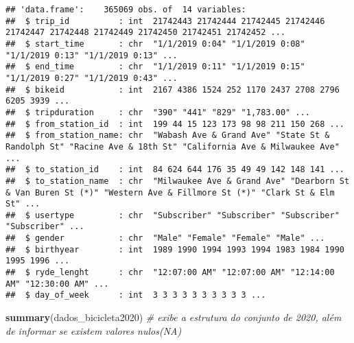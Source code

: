 \documentclass[
]{article}
\newenvironment{Shaded}{\begin{snugshade}}{\end{snugshade}}
\newcommand{\CommentTok}[1]{\textcolor[rgb]{0.56,0.35,0.01}{\textit{#1}}}
\newcommand{\FunctionTok}[1]{\textcolor[rgb]{0.13,0.29,0.53}{\textbf{#1}}}
\newcommand{\NormalTok}[1]{#1}
\begin{document}
\begin{verbatim}
## 'data.frame':    365069 obs. of  14 variables:
##  $ trip_id          : int  21742443 21742444 21742445 21742446 21742447 21742448 21742449 21742450 21742451 21742452 ...
##  $ start_time       : chr  "1/1/2019 0:04" "1/1/2019 0:08" "1/1/2019 0:13" "1/1/2019 0:13" ...
##  $ end_time         : chr  "1/1/2019 0:11" "1/1/2019 0:15" "1/1/2019 0:27" "1/1/2019 0:43" ...
##  $ bikeid           : int  2167 4386 1524 252 1170 2437 2708 2796 6205 3939 ...
##  $ tripduration     : chr  "390" "441" "829" "1,783.00" ...
##  $ from_station_id  : int  199 44 15 123 173 98 98 211 150 268 ...
##  $ from_station_name: chr  "Wabash Ave & Grand Ave" "State St & Randolph St" "Racine Ave & 18th St" "California Ave & Milwaukee Ave" ...
##  $ to_station_id    : int  84 624 644 176 35 49 49 142 148 141 ...
##  $ to_station_name  : chr  "Milwaukee Ave & Grand Ave" "Dearborn St & Van Buren St (*)" "Western Ave & Fillmore St (*)" "Clark St & Elm St" ...
##  $ usertype         : chr  "Subscriber" "Subscriber" "Subscriber" "Subscriber" ...
##  $ gender           : chr  "Male" "Female" "Female" "Male" ...
##  $ birthyear        : int  1989 1990 1994 1993 1994 1983 1984 1990 1995 1996 ...
##  $ ryde_lenght      : chr  "12:07:00 AM" "12:07:00 AM" "12:14:00 AM" "12:30:00 AM" ...
##  $ day_of_week      : int  3 3 3 3 3 3 3 3 3 3 ...
\end{verbatim}

\begin{Shaded}
\begin{Highlighting}[]
\FunctionTok{summary}\NormalTok{(dados\_bicicleta2020) }\CommentTok{\# exibe a estrutura do conjunto de 2020, além de informar se existem valores nulos(NA)}
\end{Highlighting}
\end{Shaded}
\end{document}
